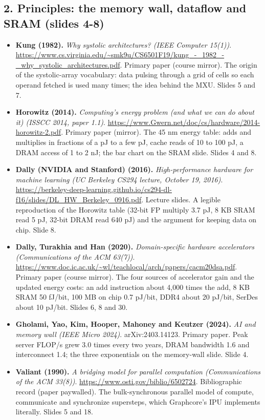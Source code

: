 \documentclass[11pt,letterpaper]{article}
\begin{document}
\subsection*{2. Principles: the memory wall, dataflow and SRAM (slides 4-8)}
\begin{itemize}[leftmargin=1.2em,itemsep=3pt]\sloppy
\item \textbf{Kung (1982).} \textit{Why systolic architectures? (IEEE Computer 15(1))}. \url{https://www.cs.virginia.edu/~smk9u/CS6501F19/kung_-_1982_-_why_systolic_architectures.pdf}. Primary paper (course mirror). The origin of the systolic-array vocabulary: data pulsing through a grid of cells so each operand fetched is used many times; the idea behind the MXU. Slides 5 and 7.
\item \textbf{Horowitz (2014).} \textit{Computing's energy problem (and what we can do about it) (ISSCC 2014, paper 1.1)}. \url{https://www.Gwern.net/doc/cs/hardware/2014-horowitz-2.pdf}. Primary paper (mirror). The 45 nm energy table: adds and multiplies in fractions of a pJ to a few pJ, cache reads of 10 to 100 pJ, a DRAM access of 1 to 2 nJ; the bar chart on the SRAM slide. Slides 4 and 8.
\item \textbf{Dally (NVIDIA and Stanford) (2016).} \textit{High-performance hardware for machine learning (UC Berkeley CS294 lecture, October 19, 2016)}. \url{https://berkeley-deep-learning.github.io/cs294-dl-f16/slides/DL_HW_Berkeley_0916.pdf}. Lecture slides. A legible reproduction of the Horowitz table (32-bit FP multiply 3.7 pJ, 8 KB SRAM read 5 pJ, 32-bit DRAM read 640 pJ) and the argument for keeping data on chip. Slide 8.
\item \textbf{Dally, Turakhia and Han (2020).} \textit{Domain-specific hardware accelerators (Communications of the ACM 63(7))}. \url{https://www.doc.ic.ac.uk/~wl/teachlocal/arch/papers/cacm20dsa.pdf}. Primary paper (course mirror). The four sources of accelerator gain and the updated energy costs: an add instruction about 4,000 times the add, 8 KB SRAM 50 fJ/bit, 100 MB on chip 0.7 pJ/bit, DDR4 about 20 pJ/bit, SerDes about 10 pJ/bit. Slides 6, 8 and 30.
\item \textbf{Gholami, Yao, Kim, Hooper, Mahoney and Keutzer (2024).} \textit{AI and memory wall (IEEE Micro 2024)}. arXiv:2403.14123. Primary paper. Peak server FLOP/s grew 3.0 times every two years, DRAM bandwidth 1.6 and interconnect 1.4; the three exponentials on the memory-wall slide. Slide 4.
\item \textbf{Valiant (1990).} \textit{A bridging model for parallel computation (Communications of the ACM 33(8))}. \url{https://www.osti.gov/biblio/6502724}. Bibliographic record (paper paywalled). The bulk-synchronous parallel model of compute, communicate and synchronize supersteps, which Graphcore's IPU implements literally. Slides 5 and 18.

\end{itemize}
\end{document}

